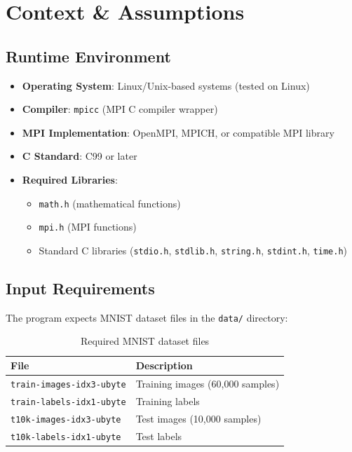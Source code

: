 \documentclass[11pt,a4paper]{article}
\begin{document}
\section{Context \& Assumptions}

\subsection{Runtime Environment}

\begin{itemize}
    \item \textbf{Operating System}: Linux/Unix-based systems (tested on Linux)
    \item \textbf{Compiler}: \texttt{mpicc} (MPI C compiler wrapper)
    \item \textbf{MPI Implementation}: OpenMPI, MPICH, or compatible MPI library
    \item \textbf{C Standard}: C99 or later
    \item \textbf{Required Libraries}: 
    \begin{itemize}
        \item \texttt{math.h} (mathematical functions)
        \item \texttt{mpi.h} (MPI functions)
        \item Standard C libraries (\texttt{stdio.h}, \texttt{stdlib.h}, \texttt{string.h}, \texttt{stdint.h}, \texttt{time.h})
    \end{itemize}
\end{itemize}

\subsection{Input Requirements}

The program expects MNIST dataset files in the \texttt{data/} directory:

\begin{table}[h]
\centering
\begin{tabular}{@{}ll@{}}
\toprule
\textbf{File} & \textbf{Description} \\
\midrule
\texttt{train-images-idx3-ubyte} & Training images (60,000 samples) \\
\texttt{train-labels-idx1-ubyte} & Training labels \\
\texttt{t10k-images-idx3-ubyte} & Test images (10,000 samples) \\
\texttt{t10k-labels-idx1-ubyte} & Test labels \\
\bottomrule
\end{tabular}
\caption{Required MNIST dataset files}
\end{table}
\end{document}
